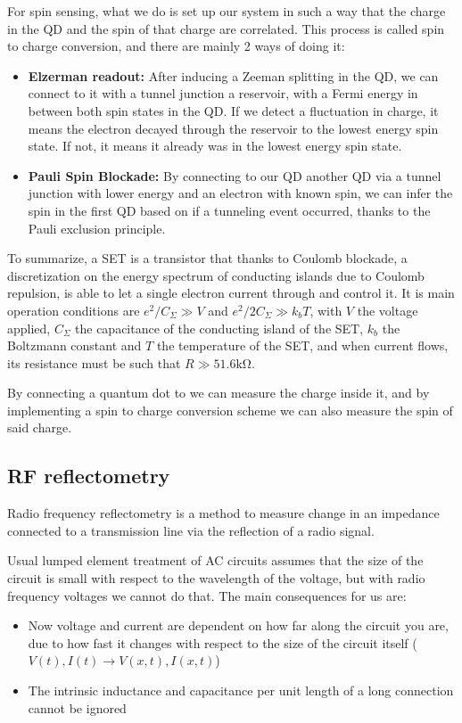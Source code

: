 \documentclass[../main.tex]{subfiles}
\begin{document}
For spin sensing, what we do is set up our system in such a way that the charge
in the QD and the spin of that charge are correlated. This process is called
spin to charge conversion, and there are mainly 2 ways of doing it:

\begin{itemize}
    \item \textbf{Elzerman readout:} After inducing a Zeeman splitting in the
        QD, we can connect to it with a tunnel junction a reservoir,
         with a Fermi energy in between both spin states in the
        QD. If we detect a fluctuation in charge, it means the electron
        decayed through the reservoir to the lowest energy spin state. If
        not, it means it already was in the lowest energy spin state.
    \item \textbf{Pauli Spin Blockade:} By connecting to our QD another QD via a tunnel junction
        with lower energy and an electron with known spin, we can infer the
        spin in the first QD based on if a tunneling event occurred, thanks
        to the Pauli exclusion principle.
\end{itemize}

To summarize, a SET is a transistor that thanks to Coulomb blockade,
a discretization on the energy spectrum of conducting islands due to
Coulomb repulsion, is able to let a single electron current through and
control it. It is main operation conditions are \(e^2/C_{\Sigma} \gg V\)
and \(e^2/2C_{\Sigma} \gg k_{b}T\), with \(V\) the voltage applied,
\(C_{\Sigma}\) the capacitance of the conducting island of the SET, \(k_{b}\)
the Boltzmann constant and \(T\) the temperature of the SET, and when current
flows, its resistance must be such that \(R \gg 51.6\unit{\kilo\ohm}\).

By connecting a quantum dot to we can measure the charge inside it, and
by implementing a spin to charge conversion scheme we can also measure
the spin of said charge.

\newpage
\subsection{RF reflectometry}
\label{subsec:RFRef}
Radio frequency reflectometry is a method to measure change in an impedance
connected to a transmission line via the reflection of a radio signal.

Usual lumped element treatment of AC circuits assumes that the size of the
circuit is small with respect to the wavelength of the voltage,
but with radio frequency voltages we cannot do that. The main consequences for
us are:
\begin{itemize}
    \item Now voltage and current are dependent on how far along the circuit
    you are, due to how fast it changes with respect to the size of the circuit
    itself (\(V(t), I(t) \rightarrow V(x, t), I(x, t)\))
\item The intrinsic inductance and capacitance per unit length of a long
    connection cannot be ignored
\end{itemize}
\end{document}
